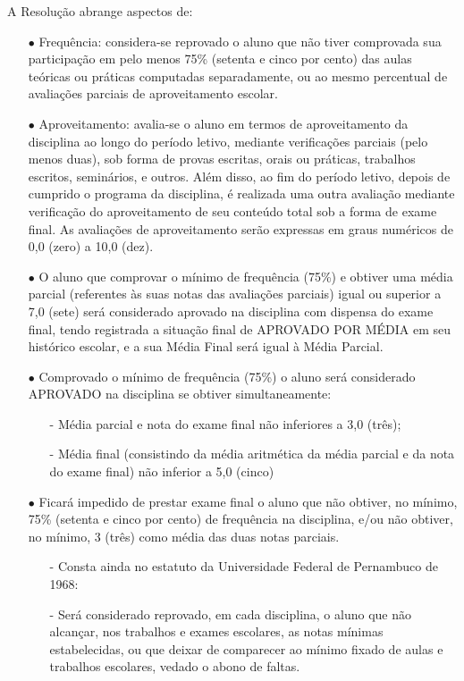 A Resolução abrange aspectos de:
\begin{enumerate}
\item[$\bullet$] Frequência: considera-se reprovado o aluno que não tiver comprovada sua participação em pelo menos 75\% (setenta e cinco por cento) das aulas teóricas ou práticas computadas separadamente, ou ao mesmo percentual de avaliações parciais de aproveitamento escolar.
\item[$\bullet$] Aproveitamento: avalia-se o aluno em termos de aproveitamento da disciplina ao longo do período letivo, mediante verificações parciais (pelo menos duas), sob forma de provas escritas, orais ou práticas, trabalhos escritos, seminários, e outros. Além disso, ao fim do período letivo, depois de cumprido o programa da disciplina, é realizada uma outra avaliação mediante verificação do aproveitamento de seu conteúdo total sob a forma de exame final. As avaliações de aproveitamento serão expressas em graus numéricos de 0,0 (zero) a 10,0 (dez).
\item[$\bullet$] O aluno que comprovar o mínimo de frequência (75\%) e obtiver uma média parcial (referentes às suas notas das avaliações parciais) igual ou superior a 7,0 (sete) será considerado aprovado na disciplina com dispensa do exame final, tendo registrada a situação final de APROVADO POR MÉDIA em seu histórico escolar, e a sua Média Final será igual à Média Parcial.
\item[$\bullet$] Comprovado o mínimo de frequência (75\%) o aluno será considerado APROVADO na disciplina se obtiver simultaneamente:
\begin{itemize}
	\item[-] Média parcial e nota do exame final não inferiores a 3,0 (três);
    \item[-] Média final (consistindo da média aritmética da média parcial e da nota do exame final) não inferior a 5,0 (cinco)
\end{itemize}
\item[$\bullet$] Ficará impedido de prestar exame final o aluno que não obtiver, no mínimo, 75\% (setenta e cinco por cento) de frequência na disciplina, e/ou não obtiver, no mínimo, 3 (três) como média das duas notas parciais.
\begin{itemize}
	\item[-] Consta ainda no estatuto da Universidade Federal de Pernambuco de 1968:
    \item[-] Será considerado reprovado, em cada disciplina, o aluno que não alcançar, nos trabalhos e exames escolares, as notas mínimas estabelecidas, ou que deixar de comparecer ao mínimo fixado de aulas e trabalhos escolares, vedado o abono de faltas.
\end{itemize}
\end{enumerate}

